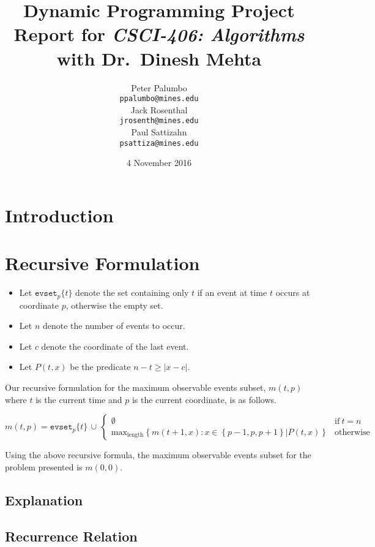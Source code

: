 \documentclass[titlepage,12pt]{article}
\title{\textbf{Dynamic Programming Project} \\ {\small Report for \emph{CSCI-406:
Algorithms} with Dr.~Dinesh Mehta}}
\author{%
    Peter Palumbo \\ {\small\texttt{ppalumbo@mines.edu}} \\[12pt]
    Jack Rosenthal \\ {\small\texttt{jrosenth@mines.edu}} \\[12pt]
    Paul Sattizahn \\ {\small\texttt{psattiza@mines.edu}} \\
}
\date{4 November 2016}
\let\ge=\geqslant
\begin{document}
\maketitle
\section{Introduction}


\section{Recursive Formulation}

\begin{itemize}
    \item Let $\mathtt{evset}_p\{t\}$ denote the set containing only $t$ if an event
        at time $t$ occurs at coordinate $p$, otherwise the empty set.
    \item Let $n$ denote the number of events to occur.
    \item Let $c$ denote the coordinate of the last event.
    \item Let $P(t, x)$ be the predicate $n - t \ge |x - c|$.
\end{itemize}

Our recursive formulation for the maximum observable events subset, $m(t, p)$
where $t$ is the current time and $p$ is the current coordinate, is as
follows.

\begin{displaymath}
    m(t, p) = \mathtt{evset}_p\{t\}\, \cup\,
    \begin{cases}
        \emptyset & \text{if}\ t = n \\
        \text{max}_{\text{length}} \left\{m(t + 1, x) :
        x \in \left\{p - 1, p, p + 1\right\} | P(t, x)
        \right\} & \text{otherwise}
    \end{cases}
\end{displaymath}

Using the above recursive formula, the maximum observable events subset for the
problem presented is $m(0, 0)$.

\subsection{Explanation}


\subsection{Recurrence Relation}
\end{document}
